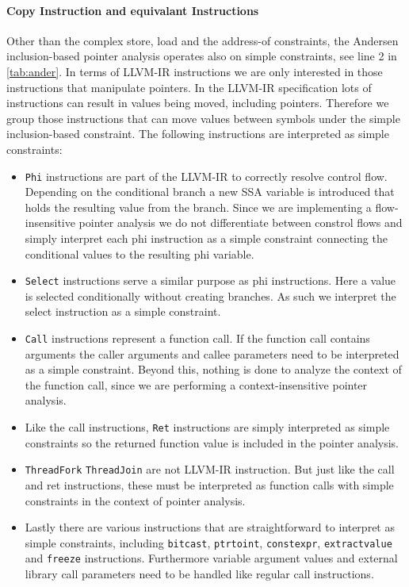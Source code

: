 \paragraph{Copy Instruction and equivalant Instructions}
Other than the complex store, load and the address-of constraints, the Andersen inclusion-based pointer analysis operates also on simple constraints, see line 2 in \autoref{tab:ander}. In terms of LLVM-IR instructions we are only interested in those instructions that manipulate pointers. In the LLVM-IR specification lots of instructions can result in values being moved, including pointers. Therefore we group those instructions that can move values between symbols under the simple inclusion-based constraint.
The following instructions are interpreted as simple constraints:
\begin{itemize}
    \item \verb|Phi| instructions are part of the LLVM-IR to correctly resolve control flow. Depending on the conditional branch a new SSA variable is introduced that holds the resulting value from the branch.
          Since we are implementing a flow-insensitive pointer analysis we do not differentiate between constrol flows and simply interpret each phi instruction as a simple constraint connecting the conditional values to the resulting phi variable.
    \item \verb|Select| instructions serve a similar purpose as phi instructions. Here a value is selected conditionally without creating branches. As such we interpret the select instruction as a simple constraint.
    \item \verb|Call| instructions represent a function call. If the function call contains arguments the caller arguments and callee parameters need to be interpreted as a simple constraint. Beyond this, nothing is done to analyze the context of the function call, since we are performing a context-insensitive pointer analysis.
    \item Like the call instructions, \verb|Ret| instructions are simply interpreted as simple constraints so the returned function value is included in the pointer analysis.
    \item \verb|ThreadFork| \verb|ThreadJoin| are not LLVM-IR instruction. But just like the call and ret instructions, these must be interpreted as function calls with simple constraints in the context of pointer analysis.
    \item Lastly there are various instructions that are straightforward to interpret as simple constraints, including \verb|bitcast|, \verb|ptrtoint|, \verb|constexpr|, \verb|extractvalue| and \verb|freeze| instructions. Furthermore variable argument values and external library call parameters need to be handled like regular call instructions.
\end{itemize}

